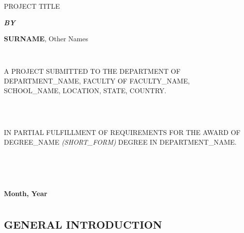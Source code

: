\documentclass[12pt]{report}
\begin{document}
	
	\begin{center}
		\LARGE PROJECT TITLE
	\end{center}
	
	\hspace{5cm}
	
	\begin{center}
		\textbf{\textit{BY}}
	\end{center}
	
	\hspace{5cm}
	
	\begin{center}
		\Large \textbf{SURNAME}, Other Names
	\end{center}
	
	\hspace{9cm} \\
	
	\begin{center}
		A PROJECT SUBMITTED TO THE DEPARTMENT OF DEPARTMENT_NAME, FACULTY OF FACULTY_NAME, SCHOOL_NAME, LOCATION, STATE, COUNTRY.
	\end{center}
	
	\hspace{8cm} \\ \\
	
	\begin{center}
		IN PARTIAL FULFILLMENT OF REQUIREMENTS FOR THE AWARD OF DEGREE_NAME \textit{(SHORT_FORM)} DEGREE IN DEPARTMENT_NAME.
	\end{center}
	\hspace{5cm}
	\\ \\ \\
	\begin{center}
		\textbf{Month, Year}
	\end{center}
	
	\newpage
	
	\tableofcontents
	
	\newpage
	
	\chapter{}
	
	\section{GENERAL INTRODUCTION}
	
	
	
\end{document}
